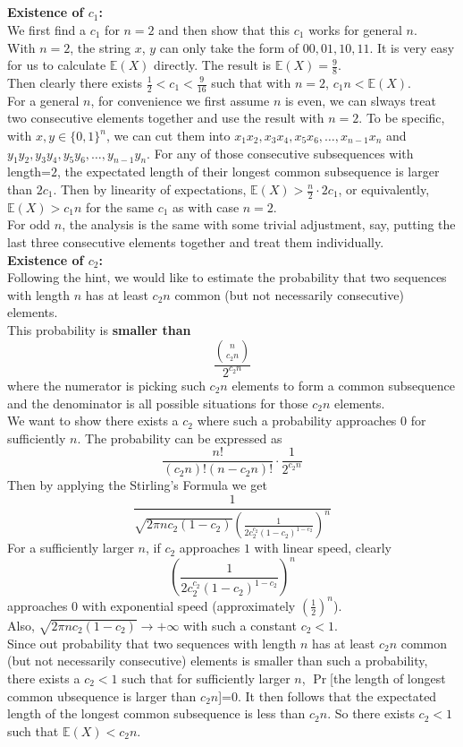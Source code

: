 \documentclass[12pt,letterpaper]{article}
\begin{document}
\subsection{}
\textbf{Existence of $c_1$:}\\
We first find a $c_1$ for $n=2$ and then show that this $c_1$ works for general $n$.\\
With $n=2$, the string $x$, $y$ can only take the form of $00,01,10,11$.
It is very easy for us to calculate $\mathbb{E}(X)$ directly.
The result is $\mathbb{E}(X)=\frac{9}{8}$.\\
Then clearly there exists $\frac{1}{2}<c_1<\frac{9}{16}$ such that with $n=2$, $c_1n<\mathbb{E}(X)$.\\
For a general $n$, for convenience we first assume $n$ is even,
we can slways treat two consecutive elements together and use the result with $n=2$.
To be specific, with $x,y\in\{0,1\}^{n}$,
we can cut them into $x_1x_2,x_3x_4,x_5x_6,\dots,x_{n-1}x_n$ and $y_1y_2,y_3y_4,y_5y_6,\dots,y_{n-1}y_n$.
For any of those consecutive subsequences with length=$2$,
the expectated length of their longest common subsequence is larger than $2c_1$.
Then by linearity of expectations, $\mathbb{E}(X)>\frac{n}{2}\cdot 2c_1$,
or equivalently, $\mathbb{E}(X)>c_1n$ for the same $c_1$ as with case $n=2$.\\
For odd $n$, the analysis is the same with some trivial adjustment, say, 
putting the last three consecutive elements together and treat them individually.\\
\textbf{Existence of $c_2$:}\\
Following the hint, we would like to estimate the probability that 
two sequences with length $n$ has at least $c_2n$ common (but not necessarily consecutive) elements.\\
This probability is \textbf{smaller than}
$$\frac{\binom{n}{c_2n}}{2^{c_2n}}$$
where the numerator is picking such $c_2n$ elements to form a common subsequence
and the denominator is all possible situations for those $c_2n$ elements.\\
We want to show there exists a $c_2$ where such a probability approaches $0$ for sufficiently $n$.
The probability can be expressed as 
$$\frac{n!}{(c_2n)!(n-c_2n)!}\cdot\frac{1}{2^{c_2n}}$$
Then by applying the Stirling's Formula we get 
$$\frac{1}{\sqrt{2\pi nc_2(1-c_2)}\left(\frac{1}{2c_{2}^{c_2}(1-c_2)^{1-c_2}}\right)^n}$$
For a sufficiently larger $n$, 
if $c_2$ approaches $1$ with linear speed, clearly
$$\left(\frac{1}{2c_{2}^{c_2}(1-c_2)^{1-c_2}}\right)^n$$ 
approaches $0$ with exponential speed (approximately $(\frac{1}{2})^n$).\\
Also, $\sqrt{2\pi n c_2(1-c_2)}\to+\infty$ with such a constant $c_2<1$.\\
Since out probability that two sequences with length $n$ has at least $c_2n$ common (but not necessarily consecutive) elements
is smaller than such a probability,
there exists a $c_2<1$ such that for sufficiently larger $n$, 
$\Pr$[the length of longest common ubsequence is larger than $c_2n$]=0.
It then follows that the expectated length of the longest common subsequence is less than $c_2n$.
So there exists $c_2<1$ such that $\mathbb{E}(X)<c_2n$.
\end{document}
